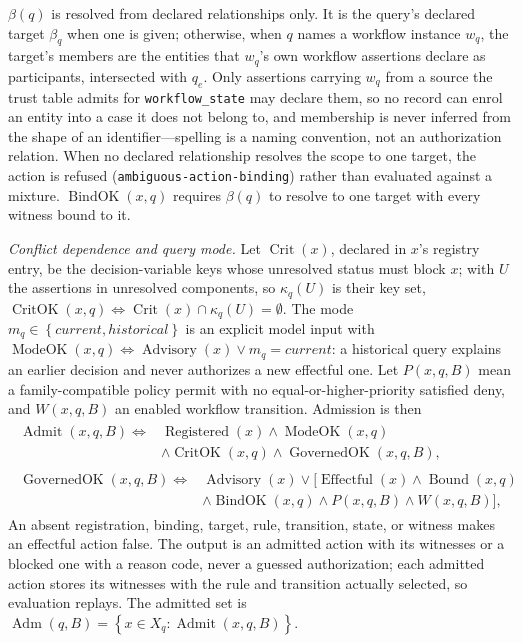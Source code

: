 \documentclass[conference]{IEEEtran}
\newcommand{\reason}[1]{\texttt{#1}}
\newcommand{\set}[1]{\left\{#1\right\}}
\begin{document}
$\beta(q)$ is resolved from declared relationships only. It is the query's declared target $\beta_q$ when one is given; otherwise, when $q$ names a workflow instance $w_q$, the target's members are the entities that $w_q$'s own workflow assertions declare as participants, intersected with $q_e$. Only assertions carrying $w_q$ from a source the trust table admits for \texttt{workflow\_state} may declare them, so no record can enrol an entity into a case it does not belong to, and membership is never inferred from the shape of an identifier---spelling is a naming convention, not an authorization relation. When no declared relationship resolves the scope to one target, the action is refused (\reason{ambiguous-action-binding}) rather than evaluated against a mixture. $\operatorname{BindOK}(x,q)$ requires $\beta(q)$ to resolve to one target with every witness bound to it.

\emph{Conflict dependence and query mode.} Let $\operatorname{Crit}(x)$, declared in $x$'s registry entry, be the decision-variable keys whose unresolved status must block $x$; with $U$ the assertions in unresolved components, so $\kappa_q(U)$ is their key set, $\operatorname{CritOK}(x,q)\Leftrightarrow \operatorname{Crit}(x)\cap\kappa_q(U)=\emptyset$. The mode $m_q\in\set{\mathit{current},\mathit{historical}}$ is an explicit model input with $\operatorname{ModeOK}(x,q)\Leftrightarrow \operatorname{Advisory}(x)\lor m_q=\mathit{current}$: a historical query explains an earlier decision and never authorizes a new effectful one. Let $P(x,q,B)$ mean a family-compatible policy permit with no equal-or-higher-priority satisfied deny, and $W(x,q,B)$ an enabled workflow transition. Admission is then
{\small
\begin{gather}
\begin{aligned}
\operatorname{Admit}(x,q,B)\Leftrightarrow{}&
\operatorname{Registered}(x)\land\operatorname{ModeOK}(x,q)\\
&\land\operatorname{CritOK}(x,q)\land\operatorname{GovernedOK}(x,q,B),
\end{aligned}
\label{eq:admission}\\
\begin{aligned}
\operatorname{GovernedOK}(x,q,B)\Leftrightarrow{}&
\operatorname{Advisory}(x)\lor\bigl[\operatorname{Effectful}(x)\land\operatorname{Bound}(x,q)\\
&\land\operatorname{BindOK}(x,q)\land P(x,q,B)\land W(x,q,B)\bigr],
\end{aligned}
\label{eq:governed}
\end{gather}
}
An absent registration, binding, target, rule, transition, state, or witness makes an effectful action false. The output is an admitted action with its witnesses or a blocked one with a reason code, never a guessed authorization; each admitted action stores its witnesses with the rule and transition actually selected, so evaluation replays. The admitted set is $\operatorname{Adm}(q,B)=\set{x\in X_q:\operatorname{Admit}(x,q,B)}$.
\end{document}
